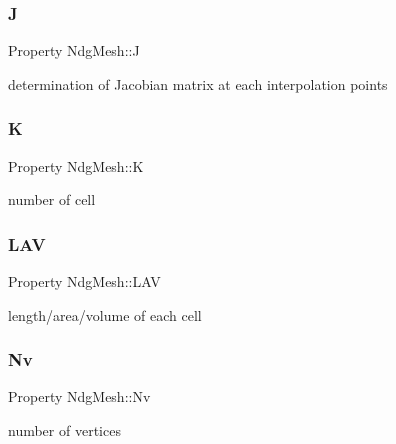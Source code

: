 \subsubsection{\texorpdfstring{J}{J}}
{\footnotesize\ttfamily Property Ndg\+Mesh\+::J\hspace{0.3cm}{\ttfamily [protected]}}



determination of Jacobian matrix at each interpolation points 

\mbox{\label{class_ndg_mesh_a81fc6a6affd3609e69eb1b8fc72b7f2f}} 
\subsubsection{\texorpdfstring{K}{K}}
{\footnotesize\ttfamily Property Ndg\+Mesh\+::K}



number of cell 

\mbox{\label{class_ndg_mesh_aaf1a7c13d209ba6a75518b156204c25f}} 
\subsubsection{\texorpdfstring{L\+AV}{LAV}}
{\footnotesize\ttfamily Property Ndg\+Mesh\+::\+L\+AV\hspace{0.3cm}{\ttfamily [protected]}}



length/area/volume of each cell 

\mbox{\label{class_ndg_mesh_a1d100eb162c56c890e007b8d2ff267a3}} 
\subsubsection{\texorpdfstring{Nv}{Nv}}
{\footnotesize\ttfamily Property Ndg\+Mesh\+::\+Nv}



number of vertices 

\mbox{\label{class_ndg_mesh_a57bac4f1f5fdcfe48791405bd0b687e5}} 
